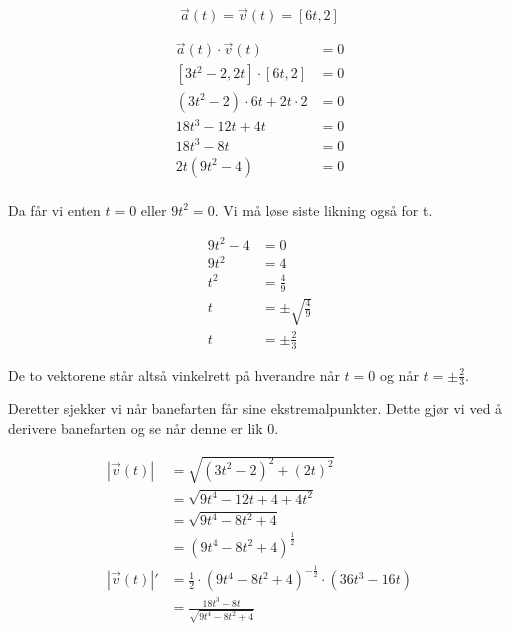 \begin{easylist}[enumerate]
		$$\vec{a}(t)  = \vec{v}(t)  = [6t,2] $$
		
		\begin{equation*}
			\begin{aligned}
				\vec{a}(t) \cdot \vec{v}(t) &= 0 \\
				[3t^2 -2,2t] \cdot [6t,2] & = 0 \\
				(3t^2 - 2) \cdot 6t + 2t \cdot 2  & = 0\\
				18t^3 - 12t + 4t & = 0 \\
				18t^3 - 8t & = 0 \\
				2t(9t^2 -4) & = 0 \\
			\end{aligned}
		\end{equation*}
		
		Da får vi enten $t = 0$ eller $9t^2 = 0$. Vi må løse siste likning også for t.
		
		\begin{equation*}
			\begin{aligned}
				9t^2 -4 & = 0 \\
				9t^2 & = 4 \\
				t^2 & = \frac{4}{9}\\
				t &= \pm \sqrt{\frac{4}{9}} \\
				t &= \pm \frac{2}{3}
			\end{aligned}
		\end{equation*}
		
		De to vektorene står altså vinkelrett på hverandre når $t = 0$ og når $t = \pm \frac{2}{3}$.
		
		Deretter sjekker vi når banefarten får sine ekstremalpunkter. Dette gjør vi ved å derivere banefarten og se når denne er lik 0.
		
		\begin{equation*}
			\begin{aligned}
				|\vec{v}(t)| & = \sqrt{(3t^2 - 2)^2 + (2t)^2} \\
								 & = \sqrt{9t^4 - 12t + 4 +4t^2} \\
								 & = \sqrt{9t^4 - 8t^2 + 4}\\
								 & = (9t^4 - 8t^2 + 4)^{\frac{1}{2}} \\
				|\vec{v}(t)| ' &= \frac{1}{2} \cdot (9t^4 - 8t^2 + 4)^{-\frac{1}{2}} \cdot (36t^3 -16t) \\
								& = \frac{18t^3 - 8t}{\sqrt{9t^4 - 8t^2 + 4}} \\
			\end{aligned}
		\end{equation*}
		

\end{easylist}
